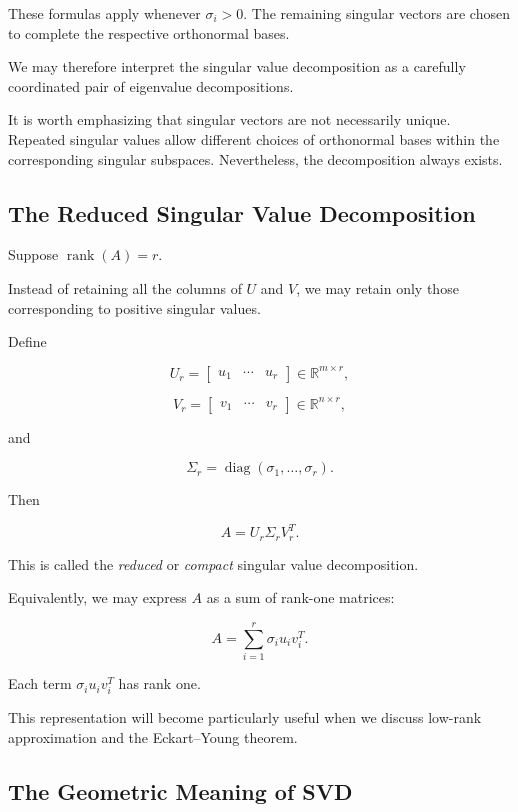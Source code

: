 \documentclass[11pt]{article}
\begin{document}
These formulas apply whenever
$\sigma_i>0$. The remaining singular
vectors are chosen to complete the
respective orthonormal bases.

We may therefore interpret the
singular value decomposition as a
carefully coordinated pair of
eigenvalue decompositions.

It is worth emphasizing that singular
vectors are not necessarily unique.
Repeated singular values allow
different choices of orthonormal bases
within the corresponding singular
subspaces. Nevertheless, the
decomposition always exists.

\subsection{The Reduced Singular Value Decomposition}

Suppose $\operatorname{rank}(A)=r$.

Instead of retaining all the columns
of $U$ and $V$, we may retain only
those corresponding to positive
singular values.

Define

\[
U_r=
\begin{bmatrix}
u_1 & \cdots & u_r
\end{bmatrix}
\in\mathbb{R}^{m\times r},
\]

\[
V_r=
\begin{bmatrix}
v_1 & \cdots & v_r
\end{bmatrix}
\in\mathbb{R}^{n\times r},
\]

and

\[
\Sigma_r
=
\operatorname{diag}
(\sigma_1,\ldots,\sigma_r).
\]

Then

\[
\boxed{
A=U_r\Sigma_rV_r^T.
}
\]

This is called the \textit{reduced}
or \textit{compact} singular value
decomposition.

Equivalently, we may express $A$
as a sum of rank-one matrices:

\[
\boxed{
A=\sum_{i=1}^{r}
\sigma_i u_i v_i^T.
}
\]

Each term $\sigma_i u_i v_i^T$
has rank one.

This representation will become
particularly useful when we discuss
low-rank approximation and the
Eckart--Young theorem.

\subsection{The Geometric Meaning of SVD}
\end{document}
